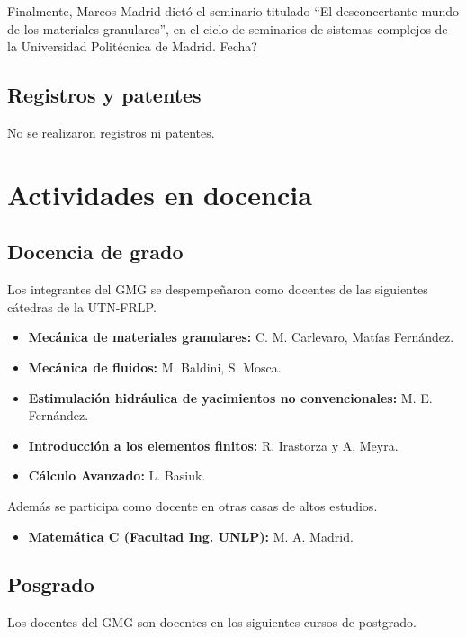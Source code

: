 \documentclass[a4paper,11pt,twoside,final,titlepage,onecolumn,openright]{report}
\begin{document}
Finalmente, Marcos Madrid dictó el seminario titulado ``El desconcertante mundo de los materiales granulares'', en el ciclo de seminarios de sistemas complejos de la Universidad Politécnica de Madrid. {\color{red}Fecha?}

\section{Registros y patentes}

No se realizaron registros ni patentes.



\chapter{Actividades en docencia}

\section{Docencia de grado}

Los integrantes del GMG se despempeñaron como docentes de las siguientes cátedras de la UTN-FRLP.

\begin{itemize}
 \item {\bf Mecánica de materiales granulares:} C. M. Carlevaro, Matías Fernández.
 \item {\bf Mecánica de fluidos:} M. Baldini, S. Mosca.
 \item {\bf Estimulación hidráulica de yacimientos no convencionales:} M. E. Fernández.
 \item {\bf Introducción a los elementos finitos:} R. Irastorza y A. Meyra.
 \item {\bf Cálculo Avanzado:} L. Basiuk.
\end{itemize}

Además se participa como docente en otras casas de altos estudios.

\begin{itemize}
 \item {\bf Matemática C (Facultad Ing. UNLP):} M. A. Madrid.
\end{itemize}


\section{Posgrado}

Los docentes del GMG son docentes en los siguientes cursos de postgrado.
\end{document}
